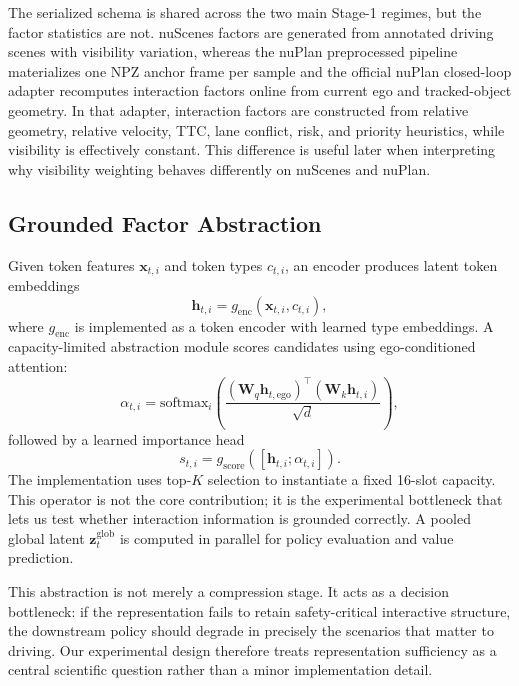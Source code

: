 \documentclass[journal]{IEEEtran}
\begin{document}
The serialized schema is shared across the two main Stage-1 regimes, but the factor statistics are not. nuScenes factors are generated from annotated driving scenes with visibility variation, whereas the nuPlan preprocessed pipeline materializes one NPZ anchor frame per sample and the official nuPlan closed-loop adapter recomputes interaction factors online from current ego and tracked-object geometry. In that adapter, interaction factors are constructed from relative geometry, relative velocity, TTC, lane conflict, risk, and priority heuristics, while visibility is effectively constant. This difference is useful later when interpreting why visibility weighting behaves differently on nuScenes and nuPlan.

\subsection{Grounded Factor Abstraction}
Given token features $\mathbf{x}_{t,i}$ and token types $c_{t,i}$, an encoder produces latent token embeddings
\begin{equation}
\mathbf{h}_{t,i} = g_{\mathrm{enc}}(\mathbf{x}_{t,i}, c_{t,i}),
\label{eq:encoder}
\end{equation}
where $g_{\mathrm{enc}}$ is implemented as a token encoder with learned type embeddings. A capacity-limited abstraction module scores candidates using ego-conditioned attention:
\begin{equation}
\alpha_{t,i} = \mathrm{softmax}_i\left(\frac{(\mathbf{W}_q \mathbf{h}_{t,\mathrm{ego}})^\top(\mathbf{W}_k \mathbf{h}_{t,i})}{\sqrt{d}}\right),
\label{eq:attention}
\end{equation}
followed by a learned importance head
\begin{equation}
s_{t,i} = g_{\mathrm{score}}([\mathbf{h}_{t,i}; \alpha_{t,i}]).
\label{eq:score}
\end{equation}
The implementation uses top-$K$ selection to instantiate a fixed 16-slot capacity. This operator is not the core contribution; it is the experimental bottleneck that lets us test whether interaction information is grounded correctly. A pooled global latent $\mathbf{z}^{\mathrm{glob}}_t$ is computed in parallel for policy evaluation and value prediction.

This abstraction is not merely a compression stage. It acts as a decision bottleneck: if the representation fails to retain safety-critical interactive structure, the downstream policy should degrade in precisely the scenarios that matter to driving. Our experimental design therefore treats representation sufficiency as a central scientific question rather than a minor implementation detail.
\end{document}
